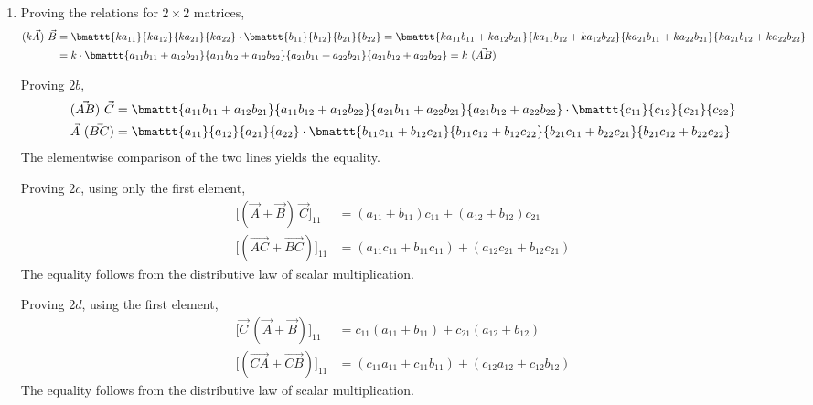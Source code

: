 \begin{enumerate}
    \item Proving the relations for $ 2 \times 2 $ matrices,
          \begin{align}
              (k\vec{A})\ \vec{B} & = \bmattt{ka_{11}}{ka_{12}}{ka_{21}}{ka_{22}}
              \cdot \bmattt{b_{11}}{b_{12}}{b_{21}}{b_{22}} =
              \bmattt{ka_{11}b_{11} + ka_{12}b_{21}}
              {ka_{11}b_{12} + ka_{12}b_{22}}
              {ka_{21}b_{11} + ka_{22}b_{21}}
              {ka_{21}b_{12} + ka_{22}b_{22}}                                      \\
                                  & = k \cdot \bmattt{a_{11}b_{11} + a_{12}b_{21}}
              {a_{11}b_{12} + a_{12}b_{22}}
              {a_{21}b_{11} + a_{22}b_{21}}
              {a_{21}b_{12} + a_{22}b_{22}} = k\ (\vec{AB})
          \end{align}

          Proving $ 2b $,
          \begin{align}
              (\vec{AB})\ \vec{C} & = \bmattt{a_{11}b_{11} + a_{12}b_{21}}
              {a_{11}b_{12} + a_{12}b_{22}}
              {a_{21}b_{11} + a_{22}b_{21}}
              {a_{21}b_{12} + a_{22}b_{22}} \cdot
              \bmattt{c_{11}}{c_{12}}{c_{21}}{c_{22}}                         \\
              \vec{A}\ (\vec{BC}) & = \bmattt{a_{11}}{a_{12}}{a_{21}}{a_{22}}
              \cdot \bmattt{b_{11}c_{11} + b_{12}c_{21}}
              {b_{11}c_{12} + b_{12}c_{22}}
              {b_{21}c_{11} + b_{22}c_{21}}
              {b_{21}c_{12} + b_{22}c_{22}}
          \end{align}
          The elementwise comparison of the two lines yields the equality.

          Proving $ 2c $, using only the first element,
          \begin{align}
              \Big[ (\vec{A} + \vec{B})\ \vec{C} \Big]_{11} &
              = (a_{11} + b_{11})c_{11} + (a_{12} + b_{12})c_{21} \\
              \Big[ (\vec{AC} + \vec{BC}) \Big]_{11}        &
              = (a_{11}c_{11} + b_{11}c_{11}) + (a_{12}c_{21} + b_{12}c_{21})
          \end{align}
          The equality follows from the distributive law of scalar multiplication.

          Proving $ 2d $, using the first element,
          \begin{align}
              \Big[\vec{C}\ (\vec{A} + \vec{B}) \Big]_{11} &
              = c_{11}(a_{11} + b_{11}) + c_{21}(a_{12} + b_{12}) \\
              \Big[ (\vec{CA} + \vec{CB}) \Big]_{11}       &
              = (c_{11}a_{11} + c_{11}b_{11}) + (c_{12}a_{12} + c_{12}b_{12})
          \end{align}
          The equality follows from the distributive law of scalar multiplication.


\end{enumerate}
